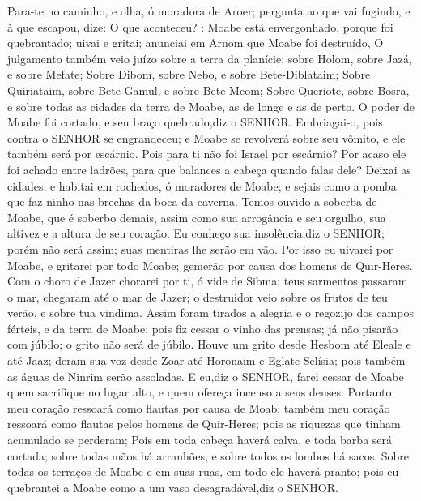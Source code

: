 {Para-te no caminho, e olha, ó moradora de Aroer; pergunta ao que vai fugindo, e à que escapou, dize: O que aconteceu?
 : Moabe está envergonhado, porque foi quebrantado; uivai e gritai; anunciai em Arnom que Moabe foi destruído,
O julgamento também veio juízo sobre a terra da planície: sobre Holom, sobre Jazá, e sobre Mefate;
Sobre Dibom, sobre Nebo, e sobre Bete-Diblataim;
Sobre Quiriataim, sobre Bete-Gamul, e sobre Bete-Meom;
Sobre Queriote, sobre Bosra, e sobre todas as cidades da terra de Moabe, as de longe e as de perto.
O poder de Moabe foi cortado, e seu braço quebrado,diz o SENHOR.
Embriagai-o, pois contra o SENHOR se engrandeceu; e Moabe se revolverá sobre seu vômito, e ele também será por escárnio.
Pois para ti não foi Israel por escárnio? Por acaso ele foi achado entre ladrões, para que balances a cabeça quando falas dele?
Deixai as cidades, e habitai em rochedos, ó moradores de Moabe; e sejais como a pomba que faz ninho nas brechas da boca da caverna.
Temos ouvido a soberba de Moabe, que é soberbo demais, assim como sua arrogância e seu orgulho, sua altivez e a altura de seu coração.
Eu conheço sua insolência,diz o SENHOR; porém não será assim; suas mentiras lhe serão em vão.
Por isso eu uivarei por Moabe, e gritarei por todo Moabe; gemerão por causa dos homens de Quir-Heres.
Com o choro de Jazer chorarei por ti, ó vide de Sibma; teus sarmentos passaram o mar,
{} chegaram até o mar de Jazer;
{} o destruidor veio sobre os frutos de teu verão, e sobre tua vindima.
Assim foram tirados a alegria e o regozijo dos campos férteis, e da terra de Moabe: pois fiz cessar o vinho das prensas; já não pisarão
{} com júbilo; o grito não será de júbilo.
Houve um grito desde Hesbom até Eleale e até Jaaz; deram sua voz desde Zoar até Horonaim e Eglate-Selísia; pois também as águas de Ninrim serão assoladas.
E eu,diz o SENHOR, farei cessar de Moabe quem sacrifique no lugar alto, e quem ofereça incenso a seus deuses.
Portanto meu coração ressoará como flautas por causa de Moab; também meu coração ressoará como flautas pelos homens de Quir-Heres; pois as riquezas que tinham acumulado se perderam;
Pois em toda cabeça haverá calva, e toda barba será cortada; sobre todas mãos há arranhões, e sobre todos os lombos há sacos.
Sobre todas os terraços de Moabe e em suas ruas, em todo ele haverá pranto; pois eu quebrantei a Moabe como a um vaso desagradável,diz o SENHOR.
}
